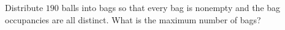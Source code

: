 Distribute $190$ balls into bags so that every bag is nonempty and the bag occupancies are all distinct. What is the maximum number of bags?
